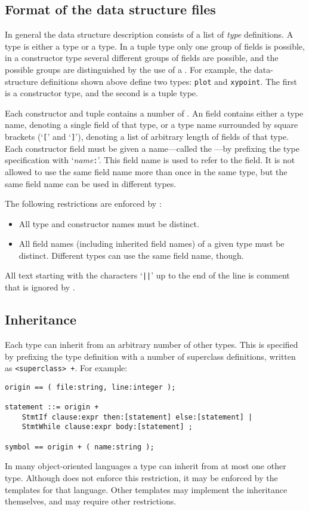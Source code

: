 \subsection{Format of the data structure files}
In general the data structure description consists of a list of
{\em type} definitions.
A type is either a  type or a  type.
In a tuple type only one group of fields is possible,
in a constructor type several different groups of fields are
possible,
and the possible groups are distinguished by the use of a .
For example, the data-structure definitions shown above define two types: 
\verb+plot+ and \verb+xypoint+. The first is a constructor type,
and the second is a tuple type.
\par
Each constructor and tuple contains a number of .
An field contains either a type name,
denoting a single field of that type,
or a type name surrounded by square brackets (`{\tt [}' and `{\tt ]}'),
denoting a list of arbitrary length of fields of that type.
Each constructor field must be given a name---called the
---by prefixing the type
specification with `{\it name\/}{\tt :}'.
This field name is used to refer to the field.
It is not allowed to use the same field name more than once in the same type,
but the same field name can be used in different types.
\par
The following restrictions are enforced by {\Tm}:
\begin{itemize}
\item
All type and constructor names must be distinct.
\item
All field names (including inherited field names) of a given type must
be distinct. Different types can use the same field name, though.
\end{itemize}
\par
All text starting with the characters `{\tt ||}' up to the end of the line
is comment that is ignored by {\Tm}.
\subsection{Inheritance}
Each type can inherit from an arbitrary number of other types.
This is specified by prefixing the type definition with a number
of superclass definitions, written as \verb"<superclass> +".
For example:
\begin{verbatim}
origin == ( file:string, line:integer );

statement ::= origin +
    StmtIf clause:expr then:[statement] else:[statement] |
    StmtWhile clause:expr body:[statement] ;

symbol == origin + ( name:string );
\end{verbatim}
In many object-oriented languages a type can inherit from at most one
other type. Although {\Tm} does not enforce this restriction, it may
be enforced by the templates for that language.
Other templates may implement the inheritance themselves, and may
require other restrictions.
